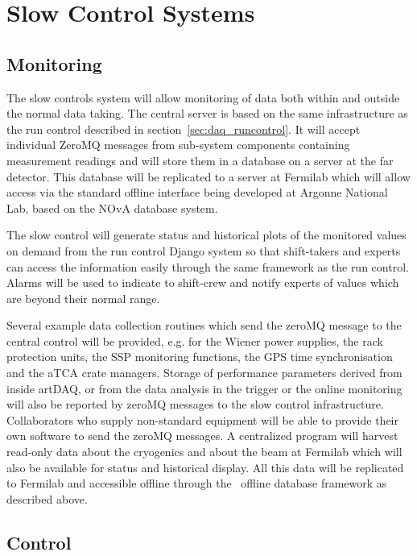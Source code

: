 \section{Slow Control Systems }
\label{sec:daq_slowcontrol}

\subsection{Monitoring}

The slow controls system will allow monitoring of data both within and
outside the normal data taking.  The central server is based on the
same infrastructure as the run control described in
section~\ref{sec:daq_runcontrol}.  It will accept individual ZeroMQ
messages from sub-system components containing measurement readings
and will store them in a database on a server at the far detector.
This database will be replicated to a server at Fermilab which will
allow access via the standard offline interface being developed at
Argonne National Lab, based on the NOvA database system.

The slow control will generate status and historical plots of the
monitored values on demand from the run control Django system so that
shift-takers and experts can access the information easily through
the same framework as the run control.  Alarms will be used to
indicate to shift-crew and notify experts of values which are beyond
their normal range.

Several example data collection routines which send the zeroMQ message
to the central control will be provided, e.g. for the Wiener power
supplies, the rack protection units, the SSP monitoring functions, the
GPS time synchronisation and the aTCA crate managers.  Storage of
performance parameters derived from inside artDAQ, or from the data
analysis in the trigger or the online monitoring will also be reported
by zeroMQ messages to the slow control infrastructure.  Collaborators
who supply non-standard equipment will be able to provide their own
software to send the zeroMQ messages.  A centralized program will
harvest read-only data about the cryogenics and about the beam at
Fermilab which will also be available for status and historical
display.  All this data will be replicated to Fermilab and accessible
offline through the \LBNE\ offline database framework as described
above.

\subsection{Control}

